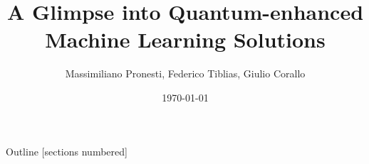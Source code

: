 \documentclass[10pt]{beamer}
\title{A Glimpse into Quantum-enhanced Machine Learning Solutions}
\date{\today}
\author{
	Massimiliano Pronesti, 
	Federico Tiblias, 
	Giulio Corallo
}
\institute{Amadeus Knowledge Sharing Session}
\begin{document}
	
	\maketitle
	
	
	
	\begin{frame}{Outline}
		[sections numbered]
		\tableofcontents
	\end{frame}
	
	    
    
	
	

	
%	
%		
%		
%	
\end{document}
